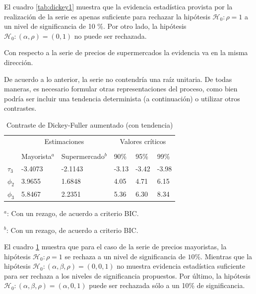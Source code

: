 \documentclass[12pt, twoside]{book}\usepackage[]{graphicx}\usepackage[]{color}
\numberwithin{equation}{section}
\numberwithin{theorem}{section}
\numberwithin{teorema}{section}
\numberwithin{defi}{section}
\numberwithin{prop}{section}
\numberwithin{defi}{section}
\theoremstyle{plain}
\begin{document}
El cuadro \ref{tab:dickey1} muestra que la evidencia estadística provista por la realización de la serie es apenas suficiente para rechazar la hipótesis $\mathcal{H}_{0}: \rho = 1$ a un nivel de significancia de 10 \%. Por otro lado, la hipótesis $\mathcal{H}_{0}: (\alpha,\rho) = (0,1) $ no puede ser rechazada.

Con respecto a la serie de precios de supermercados la evidencia va en la misma dirección. 

De acuerdo a lo anterior, la serie no contendría una raíz unitaria. De todas maneras, es necesario formular otras representaciones del proceso, como bien podría ser incluir una tendencia determinista (a continuación) o utilizar otros contrastes. 

\begin{table}[h]
\centering
\begin{threeparttable}
\caption{Contraste de Dickey-Fuller aumentado (con tendencia)\label{tab:dickey2}}
\begin{tabular}{@{}llllll@{}}
\toprule
\multicolumn{1}{l}{} & \multicolumn{2}{c}{Estimaciones} &
\multicolumn{3}{c}{Valores críticos} \\
\cmidrule(l){2-3} \cmidrule(l){4-6} \\
\multicolumn{1}{l}{} & \multicolumn{1}{c}{Mayorista$^{a}$} &
 \multicolumn{1}{c}{Supermercado$^{b}$} &
\multicolumn{1}{l}{90\%}&
\multicolumn{1}{l}{95\%}&
\multicolumn{1}{l}{99\%}
\\
\midrule
$\tau_{3} $  & -3.4073 &  -2.1143  &  -3.13 & -3.42  &  -3.98 \\
$\phi_{2} $  & 3.9655  &  1.6848   &  4.05 &  4.71 &  6.15 \\
$\phi_{3} $  & 5.8467  &  2.2351   &  5.36 &  6.30 &  8.34 \\
\bottomrule
\end{tabular}
\begin{tablenotes}
\small 
\item $^{a}$: Con un rezago, de acuerdo a criterio BIC. 
\item $^{b}$: Con un rezago, de acuerdo a criterio BIC. 
\end{tablenotes}
\end{threeparttable}
\end{table}


El cuadro \ref{tab:dickey2} muestra que para el caso de la serie de precios mayoristas, la hipótesis $\mathcal{H}_{0}: \rho=1$ se rechaza a un nivel de significancia de $10\%$. Mientras que la hipótesis $\mathcal{H}_{0}: (\alpha, \beta, \rho)=(0,0,1)$  no muestra evidencia estadística suficiente para ser rechaza a los niveles de significancia propuestos. Por último, la hipótesis $\mathcal{H}_{0}: (\alpha, \beta,\rho)=(\alpha,0,1)$ puede ser rechazada sólo a un 10\% de significancia. 
\end{document}
